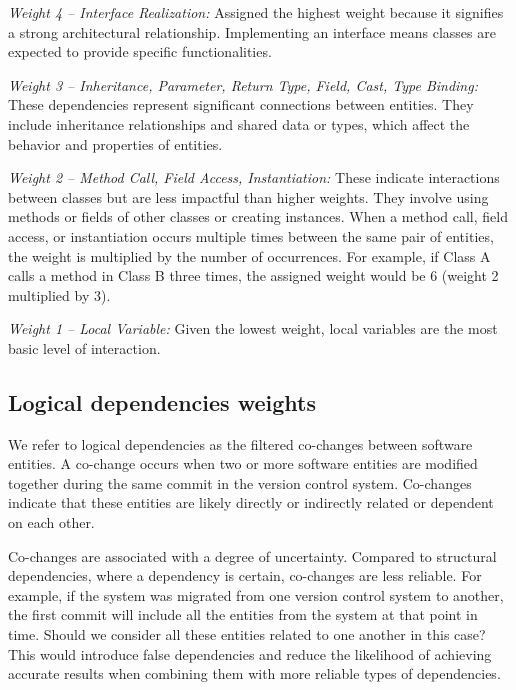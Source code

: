 \textit{Weight 4 – Interface Realization:} Assigned the highest weight because it signifies a strong architectural relationship. Implementing an interface means classes are expected to provide specific functionalities.

\textit{Weight 3 – Inheritance, Parameter, Return Type, Field, Cast, Type Binding:} These dependencies represent significant connections between entities. They include inheritance relationships and shared data or types, which affect the behavior and properties of entities.

\textit{Weight 2 – Method Call, Field Access, Instantiation:} These indicate interactions between classes but are less impactful than higher weights. They involve using methods or fields of other classes or creating instances. When a method call, field access, or instantiation occurs multiple times between the same pair of entities, the weight is multiplied by the number of occurrences. For example, if Class A calls a method in Class B three times, the assigned weight would be 6 (weight 2 multiplied by 3).

\textit{Weight 1 – Local Variable:} Given the lowest weight, local variables are the most basic level of interaction.






\subsection{Logical dependencies weights}
\label{subsec:logical_weights}


We refer to logical dependencies as the filtered co-changes between software entities. A co-change occurs when two or more software entities are modified together during the same commit in the version control system. Co-changes indicate that these entities are likely directly or indirectly related or dependent on each other.

Co-changes are associated with a degree of uncertainty. Compared to structural dependencies, where a dependency is certain, co-changes are less reliable. For example, if the system was migrated from one version control system to another, the first commit will include all the entities from the system at that point in time. Should we consider all these entities related to one another in this case? This would introduce false dependencies and reduce the likelihood of achieving accurate results when combining them with more reliable types of dependencies.

